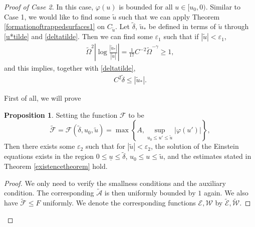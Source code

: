 \documentclass[11pt,reqno]{amsart}
\theoremstyle{definition}
\newtheorem{proposition}{Proposition}[section]
\numberwithin{equation}{section}
\def\ub{\underline{u}}
\newcommand{\tdelta}{\widetilde{\delta}}
\newcommand{\tu}{\widetilde{u}}
\begin{document}
\begin{proof}[Proof of Case 2] In this case, $\varphi(u)$ is bounded for all $u\in[u_0,0)$. 
Similar to Case 1, we would like to find some $\tu$ such that we can apply Theorem \ref{formationoftrappedsurfaces1} on $C_{\tu}$. Let $\tdelta$, $\widetilde{u}_*$ be defined in terms of $\tu$ through \eqref{u*tilde} and \eqref{deltatilde}. Then we can find some $\varepsilon_1$ such that if $|\tu|<\varepsilon_1$,
\begin{align}\label{F*>=1}
\widetilde{\Omega}^2\left|\log\frac{|\widetilde{u}_*|}{|\widetilde{u}|}\right|=\frac{1}{17}C^{-2}\widetilde{\Omega}^{-\gamma}\ge1,
\end{align}
and this implies, together with \eqref{deltatilde},
\begin{align}
\label{estimate-deltatilde}
C^2\tdelta\le |\tu_*|.
\end{align}

First of all, we will prove
\begin{proposition}\label{u0toutilde}Setting the function $\mathscr{F}$ to be
 $$\widetilde{\mathscr{F}}=\mathscr{F}(\tdelta,u_0,\widetilde{u})=\max\left\{A,\sup_{u_0\le u'\le\widetilde{u}}|\varphi(u')|\right\},$$
Then there exists some $\varepsilon_2$ such that for $|\tu|<\varepsilon_2$, the solution of the Einstein equations exists in the region $0\le\ub\le\tdelta$, $u_0\le u\le\tu$, and the estimates stated in Theorem \ref{existencetheorem} hold.
\end{proposition}
\begin{proof}
We only need to verify the smallness conditions and the auxiliary condition. The corresponding $\widetilde{\mathcal{A}}$ is then uniformly bounded by $1$ again. We also have $\widetilde{\mathscr{F}}\le F$ uniformly. We denote the corresponding functions $\mathscr{E},\mathscr{W}$ by $\widetilde{\mathscr{E}},\widetilde{\mathscr{W}}$. 




\end{proof}
\end{proof}
\end{document}
